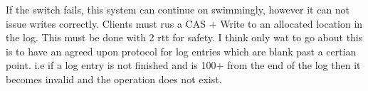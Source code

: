 If the switch fails, this system can continue on swimmingly,
however it can not issue writes correctly. Clients must rus
a CAS + Write to an allocated location in the log. This must
be done with 2 rtt for safety. I think only wat to go about
this is to have an agreed upon protocol for log entries
which are blank past a certian point. i.e if a log entry is
not finished and is 100+ from the end of the log then it
becomes invalid and the operation does not exist.



